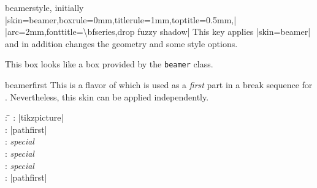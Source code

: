 \begin{docTcbKey}{beamer}{}{style, initially\\
  |skin=beamer,boxrule=0mm,titlerule=1mm,toptitle=0.5mm,|\\
  |arc=2mm,fonttitle=\textbackslash bfseries,drop fuzzy shadow|
}
  This key applies |skin=beamer| and in addition changes the geometry and some style options.
\end{docTcbKey}



\begin{dispExample}
\end{dispExample}



\begin{dispExample}
\begin{tcolorbox}[beamer,colback=Salmon!50!white,colframe=FireBrick!75!black,
  adjusted title=A colored box with the \enquote{beamer} skin]
This box looks like a box provided by the \texttt{beamer} class.
\end{tcolorbox}
\end{dispExample}


\begin{dispExample}
\begin{tcolorbox}[beamer,colframe=blue,colback=black,
  watermark graphics=lichtspiel.jpg,
  coltext=white,watermark opacity=0.75,watermark stretch=1.0,
  title=Beamer Box with background picture]
\lipsum[1]
\end{tcolorbox}
\end{dispExample}




\clearpage
\begin{docSkin}{beamerfirst}
This is a flavor of  which is used as a \emph{first} part
in a break sequence for .
Nevertheless, this skin can be applied independently.
\begin{tcolorbox}[skintable=beamerfirst]
  \begin{tabbing}
    : \=\kill
    :  \> |tikzpicture|\\ 
    :           \> |pathfirst|\\
    : \> \emph{special}\\ 
    :        \> \emph{special}\\
    :    \> \emph{special}\\
    :           \> |pathfirst|
  \end{tabbing}
\end{tcolorbox}
\end{docSkin}


